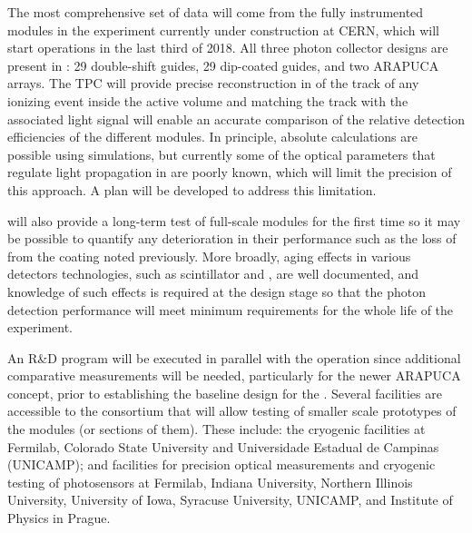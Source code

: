 The most comprehensive set of data will come from the fully instrumented modules in the  experiment currently 
under construction at CERN, which will start operations in the last third of \num{2018}.
All  three photon collector designs are present in : \num{29} 
double-shift guides, \num{29} dip-coated guides, and two ARAPUCA arrays. 
The TPC will provide precise reconstruction in \threed of the track of any ionizing event inside the active volume and matching  
the track with the associated light signal will enable an accurate comparison of the relative detection efficiencies of the different  modules. 
In principle, absolute calculations are possible using  simulations, but currently some of the optical parameters that 
regulate  light propagation in \lar are poorly known,
which will limit the precision of this approach. 
A plan will be developed to address this limitation.

 will also provide a long-term test of full-scale  modules for the first time so it may be possible to quantify any deterioration in their performance such as the loss of  from the coating noted previously. 
More broadly, aging effects in various detectors technologies, such as scintillator and , are well documented, and knowledge of such effects is required at the design stage so that the photon detection performance will meet minimum requirements for the whole life of the experiment.

An R\&D program will be executed in parallel with the  operation since additional comparative measurements will be needed, particularly for the newer ARAPUCA concept, prior to establishing the baseline design for the .
Several facilities are accessible to the consortium that will allow testing of smaller scale prototypes of the modules (or sections of them). 
These include: the cryogenic facilities 
at Fermilab,  Colorado State University and Universidade Estadual de Campinas (UNICAMP); and facilities for precision optical measurements and cryogenic testing of photosensors at Fermilab, Indiana University, Northern Illinois University, University of Iowa, Syracuse University, UNICAMP, and Institute of Physics in Prague. 

